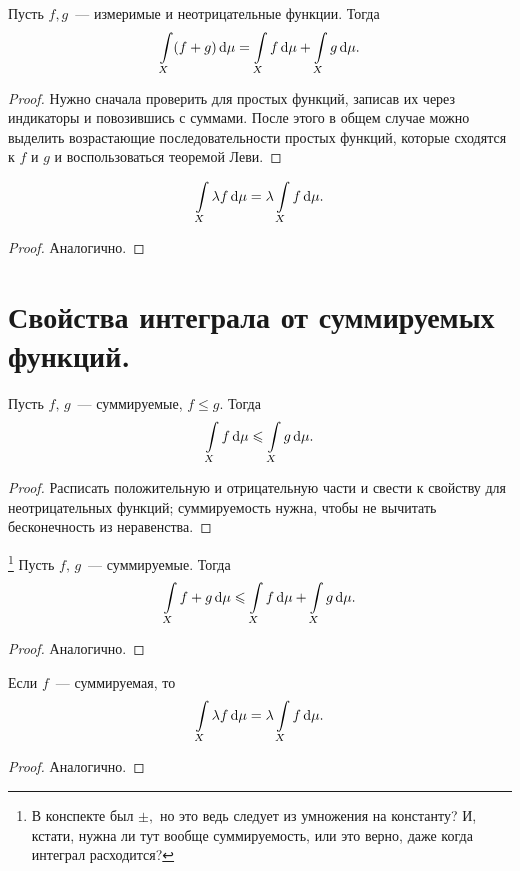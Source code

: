 \documentclass{notes}
\begin{document}
	\begin{pr}
		Пусть $f, g$~--- измеримые и неотрицательные функции. Тогда
		\[
			\int\limits_{X} (f + g) \, \mathrm{d} \mu = \int\limits_{X} f \, \mathrm{d} \mu + \int\limits_{X} g \, \mathrm{d} \mu.
		\]
		\begin{proof}
			Нужно сначала проверить для простых функций, записав их через индикаторы и повозившись с суммами. После этого в общем случае можно выделить возрастающие последовательности простых функций, которые сходятся к $f$ и $g$ и воспользоваться теоремой Леви.
		\end{proof}
	\end{pr}

	\begin{pr}
		\[
			\int\limits_{X} \lambda f \, \mathrm{d} \mu = \lambda \int\limits_{X} f \, \mathrm{d} \mu.
		\]
		\begin{proof}
			Аналогично.
		\end{proof}
	\end{pr}

\section{Свойства интеграла от суммируемых функций.}
	
	\begin{pr}
		Пусть $f, \, g$~--- суммируемые, $f \leqslant g$. Тогда
		\[
			\int\limits_{X} f \, \mathrm{d} \mu \leqslant \int\limits_{X} g \, \mathrm{d} \mu.
		\]
		\begin{proof}
			Расписать положительную и отрицательную части и свести к свойству для неотрицательных функций; суммируемость нужна, чтобы не вычитать бесконечность из неравенства.
		\end{proof}
	\end{pr}

	\begin{pr}\footnote{В конспекте был $\pm,$ но это ведь следует из умножения на константу? И, кстати, нужна ли тут вообще суммируемость, или это верно, даже когда интеграл расходится?}
		Пусть $f, \, g$~--- суммируемые. Тогда
		\[
			\int\limits_{X} f + g \, \mathrm{d} \mu \leqslant \int\limits_{X} f \, \mathrm{d} \mu + \int\limits_{X} g \, \mathrm{d} \mu.
		\]
		\begin{proof}
			Аналогично.
		\end{proof}
	\end{pr}

	\begin{pr}
		Если $f$~--- суммируемая, то
		\[
			\int\limits_{X} \lambda f \, \mathrm{d} \mu = \lambda \int\limits_{X} f \, \mathrm{d} \mu.
		\]
		\begin{proof}
			Аналогично.
		\end{proof}
	\end{pr}
\end{document}
